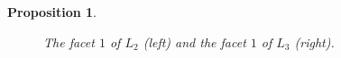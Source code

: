 \documentclass{amsart}
\newtheorem{prop}[lemma]{Proposition}
\theoremstyle{definition}
\theoremstyle{remark}
\begin{document}
\begin{prop}
\begin{enumerate}
\begin{itemize}
\begin{figure}

                \caption{The facet $1$ of $L_2$ (left) and the facet $1$ of $L_3$ (right).}\label{f4}
            \end{figure}
        \end{itemize}
        
    \end{enumerate}
\end{prop}
\end{document}

